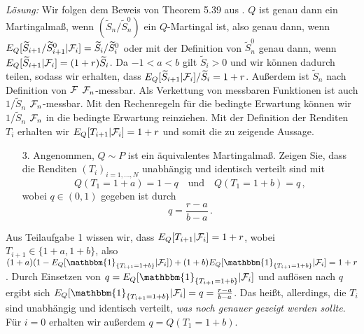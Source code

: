 \documentclass{article}
\begin{document}
\noindent\emph{Lösung: }
Wir folgen dem Beweis von Theorem 5.39 aus \cite{foellmer2016}.
$Q$ ist genau dann ein Martingalmaß, wenn $(\widetilde{S}_n/\widetilde{S}_n^0)$ ein $Q$-Martingal ist, also genau dann, wenn $E_Q[\widetilde{S}_{i+1}/\widetilde{S}^0_{i+1}|{\cal F}_i]=\widetilde{S}_i/\widetilde{S}^0_i$ oder mit der Definition von $\widetilde{S}^0_n$ genau dann, wenn $E_Q[\widetilde{S}_{i+1}|{\cal F}_i]=(1+r)\widetilde{S}_i$.
Da $-1<a<b$ gilt $\widetilde{S}_i>0$ und wir können dadurch teilen, sodass wir erhalten, dass $E_Q[\widetilde{S}_{i+1}|{\cal F}_i]/\widetilde{S}_i=1+r$.
Außerdem ist $\widetilde{S}_n$ nach Definition von ${\cal F}$ ${\cal F}_n$-messbar.
Als Verkettung von messbaren Funktionen ist auch $1/\widetilde{S}_n$ ${\cal F}_n$-messbar.
Mit den Rechenregeln für die bedingte Erwartung können wir $1/\widetilde{S}_n$ ${\cal F}_n$ in die bedingte Erwartung reinziehen.
Mit der Definition der Renditen $T_i$ erhalten wir $E_Q[T_{i+1}|{\cal F}_i]=1+r$ und somit die zu zeigende Aussage.
\begin{itemize}
\item [3.] Angenommen, $Q\sim P$ ist ein äquivalentes Martingalmaß.
  Zeigen Sie, dass die Renditen $(T_i)_{i=1,\dots,N}$ unabhängig und identisch verteilt sind mit
  \[Q(T_1=1+a)=1-q\quad\text{und}\quad Q(T_1=1+b)=q\,,\]
  wobei $q\in(0,1)$ gegeben ist durch
  \[
    q=\frac{r-a}{b-a}\,.
  \]
\end{itemize}
Aus Teilaufgabe 1 wissen wir, dass $E_Q[T_{i+1}|{\cal F}_i]=1+r$, wobei $T_{i+1}\in\{1+a,1+b\}$, also $(1+a)(1-E_Q[\mathbbm{1}_{\{T_{i+1}=1+b\}}|{\cal F}_i])+(1+b)E_Q[\mathbbm{1}_{\{T_{i+1}=1+b\}}|{\cal F}_i]=1+r$.
Durch Einsetzen von $q=E_Q[\mathbbm{1}_{\{T_{i+1}=1+b\}}|{\cal F}_i]$ und auflösen nach $q$ ergibt sich $E_Q[\mathbbm{1}_{\{T_{i+1}=1+b\}}|{\cal F}_i]=q=\frac{r-a}{b-a}$.
Das heißt, allerdings, die $T_i$ sind unabhängig und identisch verteilt, \emph{was noch genauer gezeigt werden sollte}.
Für $i=0$ erhalten wir außerdem $q=Q(T_1=1+b)$.

\end{document}
